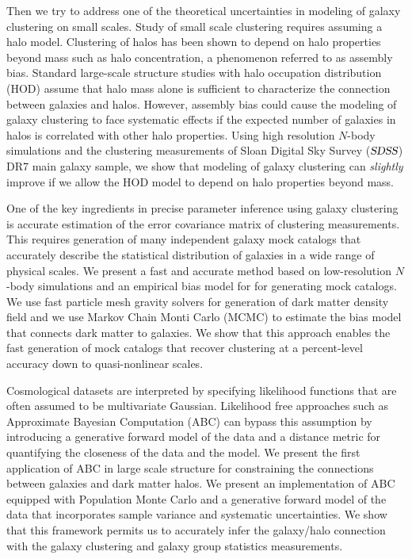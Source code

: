 Then we try to address one of the theoretical uncertainties in modeling of galaxy clustering on small scales. Study of small scale clustering requires assuming a halo model. Clustering of halos has been shown to depend on halo properties beyond mass such as halo concentration, a phenomenon referred to as assembly bias. Standard large-scale structure studies with halo occupation distribution (HOD) assume that halo mass alone is sufficient to characterize the connection between galaxies and halos. However, assembly bias could cause the modeling of galaxy clustering to face systematic effects if the expected number of galaxies in halos is correlated with other halo properties. Using high resolution $N$-body simulations and the clustering measurements of Sloan Digital Sky Survey ($\textsl{SDSS}$) DR7 main galaxy sample, we show that modeling of galaxy clustering can \emph{slightly} improve if we allow the HOD model to depend on halo properties beyond mass.

One of the key ingredients in precise parameter inference using galaxy clustering is accurate estimation of the error covariance matrix of clustering measurements. This requires generation of many independent galaxy mock catalogs that accurately describe the statistical distribution of galaxies in a wide range of physical scales. We present a fast and accurate method based on low-resolution $N$-body simulations and an empirical bias model for for generating mock catalogs. We use fast particle mesh gravity solvers for generation of dark matter density field and we use Markov Chain Monti Carlo (MCMC) to estimate the bias model that connects dark matter to galaxies. We show that this approach enables the fast generation of mock catalogs that recover clustering at a percent-level accuracy down to quasi-nonlinear scales. 

Cosmological datasets are interpreted by specifying likelihood functions that are often assumed to be multivariate Gaussian. Likelihood free approaches such as Approximate Bayesian Computation (ABC) can bypass this assumption by introducing a generative forward model of the data and a distance metric for quantifying the closeness of the data and the model. We present the first application of ABC in large scale structure for constraining the connections between galaxies and dark matter halos. 
We present an implementation of ABC equipped with Population Monte Carlo and a generative forward model of the data that incorporates sample variance and systematic uncertainties.
We show that this framework permits us to accurately infer the galaxy/halo connection with the galaxy clustering and galaxy group statistics measurements.

